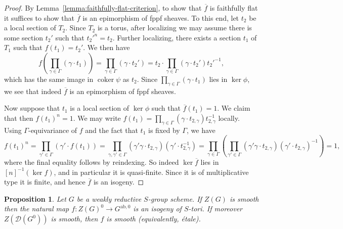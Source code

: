 \documentclass[11pt, letterpaper,english]{amsart}
\theoremstyle{plain}
\newtheorem{prop}[lem]{Proposition}
\theoremstyle{definition}
\numberwithin{equation}{section}
\numberwithin{lem}{section}
\newcommand{\sD}{{\mathscr D}}
\DeclareMathOperator{\coker} {coker}
\begin{document}
\begin{proof}
By Lemma~\ref{lemma:faithfully-flat-criterion}, to show that $\overline{f}$ is faithfully flat it suffices to show that $\overline{f}$ is an epimorphism of fppf sheaves. To this end, let $t_2$ be a local section of $T_2$. Since $T_2$ is a torus, after localizing we may assume there is some section $t_2'$ such that $t_2'^n = t_2$. Further localizing, there exists a section $t_1$ of $T_1$ such that $f(t_1) = t_2'$. We  then have
\[
f\left(\prod_{\gamma \in \Gamma} (\gamma \cdot t_1)\right) = \prod_{\gamma \in \Gamma} (\gamma \cdot t_2') = t_2 \cdot \prod_{\gamma \in \Gamma} (\gamma \cdot t_2') t_2'^{-1},
\]
which has the same image in $\coker \psi$ as $t_2$. Since $\prod_{\gamma \in \Gamma} (\gamma \cdot t_1)$ lies in $\ker \phi$, we see that indeed $\overline{f}$ is an epimorphism of fppf sheaves. 

Now suppose that $t_1$ is a local section of $\ker \phi$ such that $\overline{f}(t_1) = 1$. We claim that then $f(t_1)^n = 1$. We may write $f(t_1) = \prod_{\gamma \in \Gamma} (\gamma \cdot t_{2, \gamma}) t_{2, \gamma}^{-1}$ locally. Using $\Gamma$-equivariance of $f$ and the fact that $t_1$ is fixed by $\Gamma$, we have
\[
f(t_1)^n = \prod_{\gamma' \in \Gamma} (\gamma' \cdot f(t_1)) = \prod_{\gamma, \gamma' \in \Gamma} (\gamma' \gamma \cdot t_{2, \gamma})(\gamma' \cdot t_{2, \gamma}^{-1}) = \prod_{\gamma \in \Gamma} \left(\prod_{\gamma' \in \Gamma} (\gamma'\gamma \cdot t_{2, \gamma})(\gamma' \cdot t_{2, \gamma})^{-1}\right) = 1,
\]
where the final equality follows by reindexing. So indeed $\ker \overline{f}$ lies in $[n]^{-1}(\ker f)$, and in particular it is quasi-finite.  Since it is of multiplicative type it is finite, and hence $\overline{f}$ is an isogeny.
\end{proof}

\begin{prop} \label{proposition:isogenies}
Let $G$ be a weakly reductive $S$-group scheme. If $Z(G)$ is smooth then the natural map $f: Z(G)^0 \to G^{\mathrm{ab}, 0}$ is an isogeny of $S$-tori. If moreover $Z(\sD(G^0))$ is smooth, then $f$ is smooth (equivalently, \'{e}tale).
\end{prop}
\end{document}
